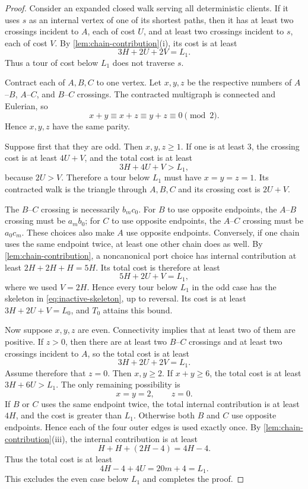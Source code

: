 \begin{proof}
Consider an expanded closed walk serving all deterministic clients.  If it
uses $s$ as an internal vertex of one of its shortest paths, then it has at
least two crossings incident to $A$, each of cost $U$, and at least two
crossings incident to $s$, each of cost $V$.  By
\cref{lem:chain-contribution}(i), its cost is at least
\[
  3H+2U+2V=L_1.
\]
Thus a tour of cost below $L_1$ does not traverse $s$.

Contract each of $A,B,C$ to one vertex.  Let $x,y,z$ be the respective numbers
of $A$--$B$, $A$--$C$, and $B$--$C$ crossings.  The contracted multigraph is
connected and Eulerian, so
\[
  x+y\equiv x+z\equiv y+z\equiv0\pmod2.
\]
Hence $x,y,z$ have the same parity.

Suppose first that they are odd.  Then $x,y,z\ge1$.  If one is at least $3$,
the crossing cost is at least $4U+V$, and the total cost is at least
\[
  3H+4U+V>L_1,
\]
because $2U>V$.  Therefore a tour below $L_1$ must have
$x=y=z=1$.  Its contracted walk is the triangle through $A,B,C$ and its
crossing cost is $2U+V$.

The $B$--$C$ crossing is necessarily $b_mc_0$.  For $B$ to use opposite
endpoints, the $A$--$B$ crossing must be $a_mb_0$; for $C$ to use opposite
endpoints, the $A$--$C$ crossing must be $a_0c_m$.  These choices also make
$A$ use opposite endpoints.  Conversely, if one chain uses the same endpoint
twice, at least one other chain does as well.  By
\cref{lem:chain-contribution}, a noncanonical port choice has internal
contribution at least $2H+2H+H=5H$.  Its total cost is therefore at least
\[
  5H+2U+V=L_1,
\]
where we used $V=2H$.  Hence every tour below $L_1$ in the odd case has the
skeleton in \cref{eq:inactive-skeleton}, up to reversal.  Its cost is at least
$3H+2U+V=L_0$, and $T_0$ attains this bound.

Now suppose $x,y,z$ are even.  Connectivity implies that at least two of them
are positive.  If $z>0$, then there are at least two $B$--$C$ crossings and at
least two crossings incident to $A$, so the total cost is at least
\[
  3H+2U+2V=L_1.
\]
Assume therefore that $z=0$.  Then $x,y\ge2$.  If $x+y\ge6$, the total cost is
at least $3H+6U>L_1$.  The only remaining possibility is
\[
  x=y=2,
  \qquad
  z=0.
\]
If $B$ or $C$ uses the same endpoint twice, the total internal contribution is
at least $4H$, and the cost is greater than $L_1$.  Otherwise both $B$ and $C$
use opposite endpoints.  Hence each of the four outer edges is used exactly
once.  By \cref{lem:chain-contribution}(iii), the internal contribution is at
least
\[
  H+H+(2H-4)=4H-4.
\]
Thus the total cost is at least
\[
  4H-4+4U
  =20m+4
  =L_1.
\]
This excludes the even case below $L_1$ and completes the proof.
\end{proof}

